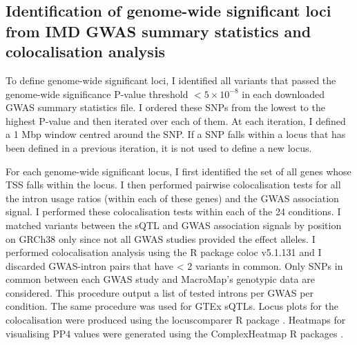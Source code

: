 \subsection{Identification of genome-wide significant loci from IMD GWAS summary statistics and colocalisation analysis}
To define genome-wide significant loci, I identified all variants that passed the genome-wide significance P-value threshold $< 5\times10^{-8}$ in each downloaded GWAS summary statistics file. I ordered these SNPs from the lowest to the highest P-value and then iterated over each of them. At each iteration, I defined a 1 Mbp window centred around the SNP. If a SNP falls within a locus that has been defined in a previous iteration, it is not used to define a new locus. 

For each genome-wide significant locus, I first identified the set of all genes whose TSS falls within the locus. I then performed pairwise colocalisation tests for all the intron usage ratios (within each of these genes) and the GWAS association signal. I performed these colocalisation tests within each of the 24 conditions. I matched variants between the sQTL and GWAS association signals by position on GRCh38 only since not all GWAS studies provided the effect alleles. I performed colocalisation analysis using the R package coloc v5.1.131 and I discarded GWAS-intron pairs that have < 2 variants in common. Only SNPs in common between each GWAS study and MacroMap's genotypic data are considered. This procedure output a list of tested introns per GWAS per condition. The same procedure was used for GTEx sQTLs. Locus plots for the colocalisation were produced using the locuscomparer R package \cite{Liu2019-fv}. Heatmaps for visualising PP4 values were generated using the ComplexHeatmap R packages \cite{Gu2016-oc}.

